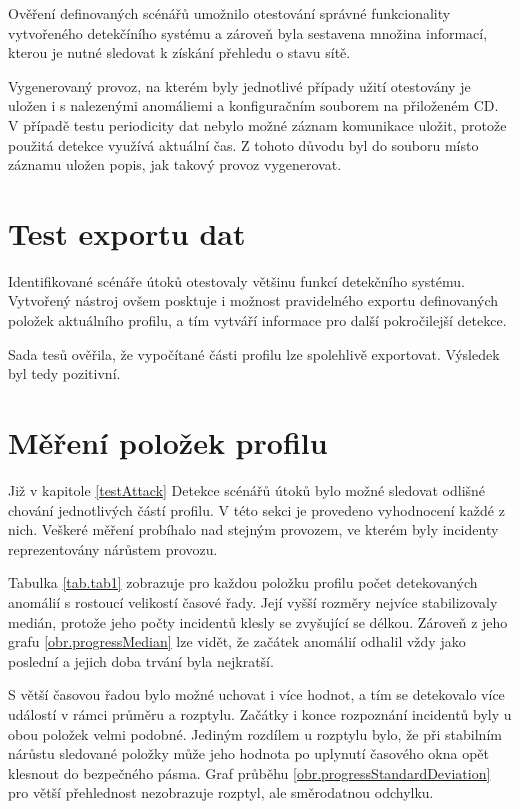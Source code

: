   Ověření definovaných scénářů umožnilo otestování správné funkcionality vytvořeného detekčíního
  systému a zároveň byla sestavena množina informací, kterou je nutné sledovat k získání 
  přehledu o stavu sítě.
  
  Vygenerovaný provoz, na kterém byly jednotlivé případy užití otestovány je uložen i s nalezenými
  anomáliemi a konfiguračním souborem na přiloženém CD. V případě testu periodicity dat nebylo možné záznam 
  komunikace uložit, protože použitá detekce využívá aktuální čas. Z tohoto důvodu 
  byl do souboru místo záznamu uložen popis, jak takový provoz vygenerovat.

\section{Test exportu dat}
Identifikované scénáře útoků otestovaly většinu funkcí detekčního systému. Vytvořený nástroj
ovšem posktuje i možnost pravidelného exportu definovaných položek aktuálního profilu, a tím 
vytváří informace pro další pokročilejší detekce. 

Sada tesů ověřila, že vypočítané části profilu lze spolehlivě exportovat. Výsledek byl tedy
pozitivní.

\section{Měření položek profilu}
Již v kapitole \ref{testAttack} Detekce scénářů útoků bylo možné sledovat odlišné chování 
jednotlivých částí profilu. V této sekci je provedeno vyhodnocení každé z nich. Veškeré 
měření probíhalo nad stejným provozem, ve kterém byly incidenty reprezentovány nárůstem provozu.

Tabulka \ref{tab.tab1} zobrazuje pro každou položku profilu počet detekovaných anomálií 
s rostoucí velikostí časové řady. Její vyšší rozměry nejvíce stabilizovaly medián, protože jeho počty
incidentů klesly se zvyšující se délkou. Zároveň z jeho grafu \ref{obr.progressMedian} lze vidět,
že začátek anomálií odhalil vždy jako poslední a jejich doba trvání byla nejkratší. 

S větší časovou řadou bylo možné uchovat i více hodnot, a 
tím se detekovalo více událostí v rámci průměru a rozptylu. Začátky i konce rozpoznání incidentů
byly u obou položek velmi podobné. Jediným rozdílem u rozptylu bylo, že při stabilním 
nárůstu sledované položky může jeho hodnota po uplynutí časového okna opět klesnout do bezpečného pásma. 
Graf průběhu \ref{obr.progressStandardDeviation} pro větší přehlednost nezobrazuje rozptyl, ale 
směrodatnou odchylku. 

